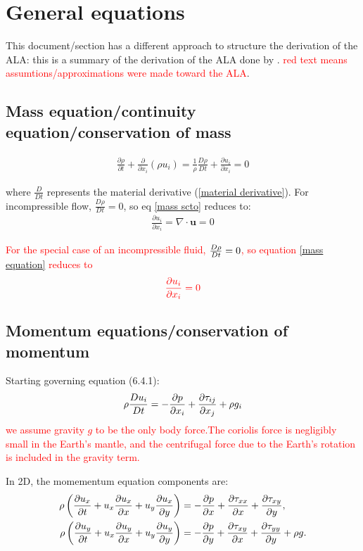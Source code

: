 \documentclass[document.tex]{subfiles}
\begin{document}
\section{\cite{scto01} General equations}
This document/section has a different approach to structure the derivation of the ALA: 
this is a summary of the derivation of the ALA done by \cite{scto01}.
\textcolor{red}{red text means assumtions/approximations were made toward the ALA}. 
\subsection{Mass equation/continuity equation/conservation of mass}
\begin{align} \label{mass scto}
\frac{\partial \rho}{\partial t} + \frac{\partial}{\partial x_i}(\rho u_i) = 
\frac{1}{\rho}\frac{D\rho}{Dt} + \frac{\partial u_i}{\partial x_i} = 0
\end{align}

where $\frac{D}{Dt}$ represents the material derivative (\ref{material derivative}). 
For incompressible flow, $\frac{D\rho}{Dt} = 0$, so eq \ref{mass scto} reduces to: 
\begin{align} \label{mass equation}
\frac{\partial u_i}{\partial x_i} = \nabla \cdot \textbf{u} =0
\end{align}

\textcolor{red}{For the special case of an incompressible fluid, $\frac{D \rho}{D t} = 0$, 
so equation \ref{mass equation} reduces to}
\begin{align}
    \color{red}
    \pdv{u_i}{x_i} = 0
\end{align}

\subsection{Momentum equations/conservation of momentum}
Starting governing equation (6.4.1): 
\begin{align} \label{momentum equation}
    \rho \frac{D u_i}{D t} = - \pdv{p}{x_i} + \pdv{\tau_{ij}}{x_j}+\rho g_i
\end{align}
\textcolor{red}{we assume gravity $g$ to be the only body force.The coriolis force is 
negligibly small in the Earth's mantle, and the centrifugal 
force due to the Earth's rotation is included in the gravity term.}

In 2D, the momementum equation components are: 
\begin{align}
\rho \left(
    \pdv{u_x}{t}
    + u_x \pdv{u_x}{x}
    + u_y \pdv{u_x}{y}
\right)
&= -\pdv{p}{x}
   + \pdv{\tau_{xx}}{x}
   + \pdv{\tau_{xy}}{y},
\\
\rho \left(
    \pdv{u_y}{t}
    + u_x \pdv{u_y}{x}
    + u_y \pdv{u_y}{y}
\right)
&= -\pdv{p}{y}
   + \pdv{\tau_{xy}}{x}
   + \pdv{\tau_{yy}}{y}
   + \rho g.
\end{align}
\end{document}
